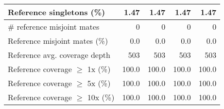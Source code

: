 \documentclass[12pt,a4paper]{article}
\begin{document}
\begin{table}[ht]
\begin{center}
\begin{tabular}{|l*{4}{|r}|}
Reference singletons (\%) & 1.47 & 1.47 & 1.47 & 1.47 \\ \hline
\# reference misjoint mates & 0 & 0 & 0 & 0 \\ \hline
Reference misjoint mates (\%) & 0.0 & 0.0 & 0.0 & 0.0 \\ \hline
Reference avg. coverage depth & 503 & 503 & 503 & 503 \\ \hline
Reference coverage $\geq$ 1x (\%) & 100.0 & 100.0 & 100.0 & 100.0 \\ \hline
Reference coverage $\geq$ 5x (\%) & 100.0 & 100.0 & 100.0 & 100.0 \\ \hline
Reference coverage $\geq$ 10x (\%) & 100.0 & 100.0 & 100.0 & 100.0 \\ \hline
\end{tabular}
\end{center}
\end{table}
\end{document}
